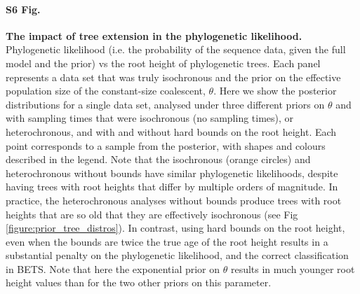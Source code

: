 \documentclass[10pt,letterpaper]{article}
\begin{document}
\paragraph*{S6 Fig.}
\label{S6_Fig}
	{\textbf{The impact of tree extension in the phylogenetic likelihood.} Phylogenetic likelihood (i.e. the probability of the sequence data, given the full model and the prior) vs the root height of phylogenetic trees. Each panel represents a data set that was truly isochronous and the prior on the effective population size of the constant-size coalescent, $\theta$. Here we show the posterior distributions for a single data set, analysed under three different priors on $\theta$ and with sampling times that were isochronous (no sampling times), or heterochronous, and with and without hard bounds on the root height. Each point corresponds to a sample from the posterior, with shapes and colours described in the legend. Note that the isochronous (orange circles) and heterochronous without bounds have similar phylogenetic likelihoods, despite having trees with root heights that differ by multiple orders of magnitude. In practice, the heterochronous analyses without bounds produce trees with root heights that are so old that they are effectively isochronous (see Fig \ref{figure:prior_tree_distros}). In contrast, using hard bounds on the root height, even when the bounds are twice the true age of the root height results in a substantial penalty on the phylogenetic likelihood, and the correct classification in BETS. Note that here the exponential prior on $\theta$ results in much younger root height values than for the two other priors on this parameter.}
\end{document}
